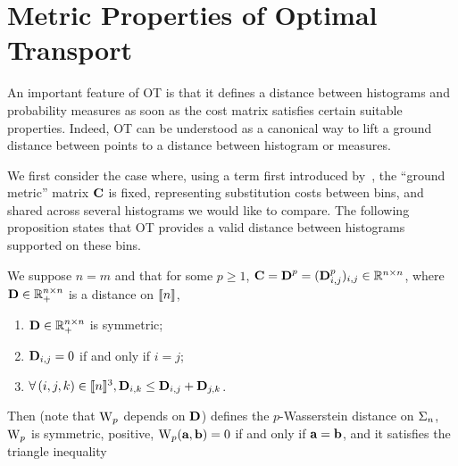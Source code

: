 \section{Metric Properties of Optimal Transport}

An important feature of OT is that it defines a distance between histograms and probability measures as soon as the cost matrix satisfies certain suitable properties. Indeed, OT can be understood as a canonical way to lift a ground distance between points to a distance between histogram or measures.

We first consider the case where, using a term first introduced by~\citet{RubTomGui00}, the ``ground metric'' matrix $\mathrm{\textbf{C}}$ is fixed, representing substitution costs between bins, and shared across several histograms we would like to compare. The following proposition states that OT provides a valid distance between histograms supported on these bins.

\begin{prop}\label{prop-metric-histo}
We suppose $n=m$ and that for some $p \geq 1$, $\mathrm{\textbf{C}}=\mathrm{\textbf{D}}^p=(\mathrm{\textbf{D}}_{i,j}^p)_{i,j} \in \mathbb{R}^{n \times n}$, where $\mathrm{\textbf{D}} \in \mathbb{R}_+^{n \times n}$ is a distance on $\llbracket n\rrbracket$, \ie
\begin{enumerate}[label=(\roman*)]
	\item $\mathrm{\textbf{D}} \in \mathbb{R}_+^{n \times n}$ is symmetric;
	\item $\mathrm{\textbf{D}}_{i,j}=0$ if and only if $i=j$;
	\item $\forall \, (i,j,k) \in \llbracket n\rrbracket^3, \mathrm{\textbf{D}}_{i,k} \leq \mathrm{\textbf{D}}_{i,j}+\mathrm{\textbf{D}}_{j,k}$.
\end{enumerate}
Then
(note that $\operatorname{\mathrm{W}}_p$ depends on $\mathrm{\textbf{D}}$) defines the $p$-Wasserstein distance on $\Sigma_n$, \ie $\operatorname{\mathrm{W}}_p$ is symmetric, positive, $\operatorname{\mathrm{W}}_p(\mathrm{\textbf{a}},\mathrm{\textbf{b}})=0$ if and only if $\mathrm{\textbf{a}} = \mathrm{\textbf{b}}$, and it satisfies the triangle inequality
\end{prop}

